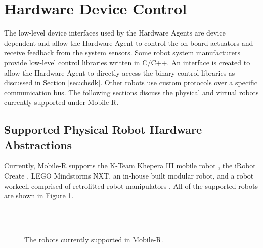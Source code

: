   \section{Hardware Device Control}\label{sec:hdc}
    The low-level device interfaces used by the Hardware Agents are device 
      dependent and allow the Hardware Agent to control the on-board actuators 
      and receive feedback from the system sensors.
    Some robot system manufacturers provide low-level control libraries written 
      in C/C++.
    An interface is created to allow the Hardware Agent to directly access the 
      binary control libraries as discussed in Section \ref{sec:chsdk}.
    Other robots use custom protocols over a specific communication bus.
    The following sections discuss the physical and virtual robots currently
      supported under Mobile-R.

    \subsection{Supported Physical Robot Hardware Abstractions} 
      \label{sec:supportedrobots}
      Currently, Mobile-R supports the K-Team Khepera III mobile robot
        \cite{kteam}, the iRobot Create \cite{GumCreate}, LEGO Mindstorms NXT,
        an in-house built modular robot, and a robot workcell comprised of 
        retrofitted robot manipulators 
        \cite{Nestinger2008,Nestinger_c2007,Nestinger}.
      All of the supported robots are shown in Figure \ref{fig:robots}.
      \begin{figure}%
      \begin{center}
        \hspace{0.500in}
         \\
        \hspace{0.50in}
        \\ 
      \end{center}
      \caption{The robots currently supported in Mobile-R.}
      \label{fig:robots}
      \end{figure}

